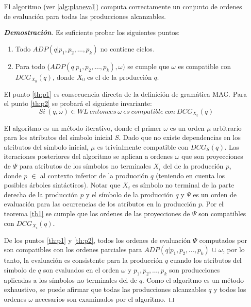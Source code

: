 \begin{theorem}
\label{th2}
El algoritmo  (ver \ref{alg:planeval}) computa correctamente un conjunto de ordenes de evaluación para todas las producciones alcanzables.
\end{theorem}

\begin{proof}[\textbf{Demostración}]
Es suficiente probar los siguientes puntos:
\begin{enumerate}
    \item \label{th:p1}Todo $ADP (q | p_{1}, p_{2}, \dots, p_{k})$ no contiene ciclos.

    \item \label{th:p2}Para todo ($ADP (q | p_{1}, p_{2}, \dots, p_{k}), \omega)$ se cumple que $\omega$ es compatible con $DCG_{X_{0}}(q)$,  donde $X_{0}$ es el  de la producción $q$.
\end{enumerate}

El punto \ref{th:p1} es consecuencia directa de la definición de gramática MAG. Para el punto \ref{th:p2} se probará el siguiente invariante:
$$
Si\ (q,\omega)\in WL\ entonces\ \omega\ es\ compatible\ con\ DCG_{X_{0}}(q)
$$

El algoritmo  es un método iterativo, donde el primer $\omega$ es un orden $\mu$ arbitrario para los atributos del símbolo inicial $S$. Dado que no existe dependencias en los atributos del símbolo inicial, $\mu$ es trivialmente compatible con $DCG_{S}(q)$. Las iteraciones posteriores del algoritmo  se aplican a ordenes $\omega$ que son proyecciones de $\Psi$ para atributos de los símbolos no terminales $X_{i}$ del  de la producción $p$, donde $p$ $\in$ al contexto inferior de la producción $q$ (teniendo en cuenta los posibles árboles sintácticos). Notar que $X_{i}$ es símbolo no terminal de la parte derecha de la producción $p$ y el símbolo  de la producción $q$ y $\Psi$ es un orden de evaluación para las ocurrencias de los atributos en la producción $p$. Por el teorema \ref{th1} se cumple que los ordenes de las proyecciones de $\Psi$ son compatibles con $DCG_{X_{i}}(q)$.

De los puntos \ref{th:p1} y \ref{th:p2}, todos los ordenes de evaluación $\Psi$ computados por  son compatibles con los ordenes parciales para $ADP (q | p_{1}, p_{2}, \dots, p_{k})$ $\cup$ $\omega$, por lo tanto, la evaluación es consistente para la producción $q$ cuando los atributos del símbolo  de $q$ son evaluados en el orden $\omega$ y $p_{1}, p_{2}, \dots, p_{k}$ son producciones aplicadas a los símbolos no terminales del  de $q$. Como el algoritmo es un método exhaustivo, se puede afirmar que todas las producciones alcanzables $q$ y todos los ordenes $\omega$ necesarios son e\-xa\-minados por el algoritmo.

\end{proof}

